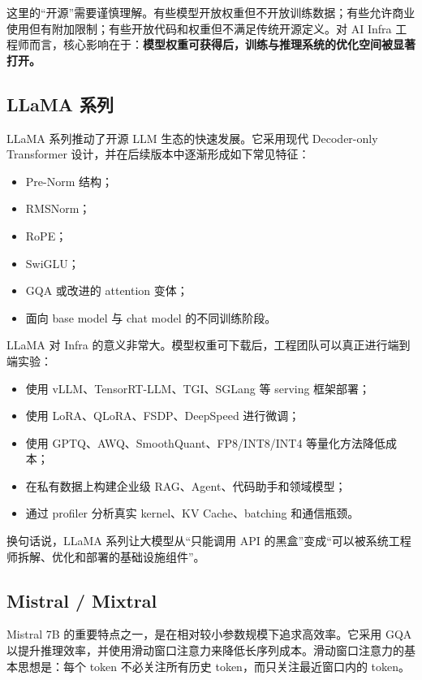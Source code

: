这里的“开源”需要谨慎理解。有些模型开放权重但不开放训练数据；有些允许商业使用但有附加限制；有些开放代码和权重但不满足传统开源定义。对 AI Infra 工程师而言，核心影响在于：\textbf{模型权重可获得后，训练与推理系统的优化空间被显著打开。}

\subsection{LLaMA 系列}
\label{subsec:llama-family}

LLaMA 系列推动了开源 LLM 生态的快速发展。它采用现代 Decoder-only Transformer 设计，并在后续版本中逐渐形成如下常见特征：

\begin{itemize}
\item Pre-Norm 结构；
\item RMSNorm；
\item RoPE；
\item SwiGLU；
\item GQA 或改进的 attention 变体；
\item 面向 base model 与 chat model 的不同训练阶段。
\end{itemize}

LLaMA 对 Infra 的意义非常大。模型权重可下载后，工程团队可以真正进行端到端实验：

\begin{itemize}
\item 使用 vLLM、TensorRT-LLM、TGI、SGLang 等 serving 框架部署；
\item 使用 LoRA、QLoRA、FSDP、DeepSpeed 进行微调；
\item 使用 GPTQ、AWQ、SmoothQuant、FP8/INT8/INT4 等量化方法降低成本；
\item 在私有数据上构建企业级 RAG、Agent、代码助手和领域模型；
\item 通过 profiler 分析真实 kernel、KV Cache、batching 和通信瓶颈。
\end{itemize}

换句话说，LLaMA 系列让大模型从“只能调用 API 的黑盒”变成“可以被系统工程师拆解、优化和部署的基础设施组件”。

\subsection{Mistral / Mixtral}
\label{subsec:mistral-mixtral}

Mistral 7B 的重要特点之一，是在相对较小参数规模下追求高效率。它采用 GQA 以提升推理效率，并使用滑动窗口注意力来降低长序列成本。滑动窗口注意力的基本思想是：每个 token 不必关注所有历史 token，而只关注最近窗口内的 token。

